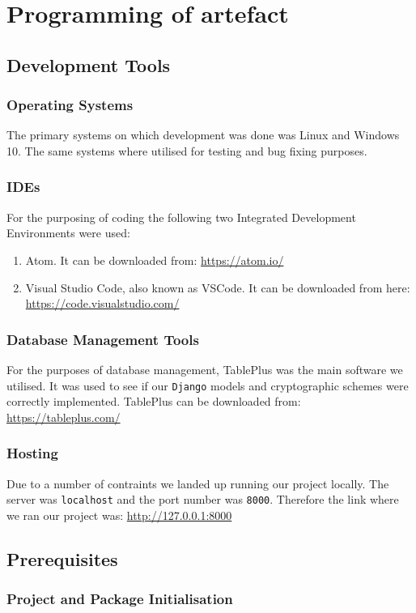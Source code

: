 \documentclass[a4paper, 12pt, titlepage]{report}
\begin{document}
\chapter{Programming of artefact}
\section{Development Tools}
\subsection{Operating Systems}
The primary systems on which development was done was Linux and Windows 10. The same systems where utilised for testing and bug fixing purposes.
\subsection{IDEs}
For the purposing of coding the following two Integrated Development Environments were used:
\begin{enumerate}
\item Atom. It can be downloaded from: \url{https://atom.io/}
\item Visual Studio Code, also known as VSCode. It can be downloaded from here: \url{https://code.visualstudio.com/}
\end{enumerate}
\subsection{Database Management Tools}
For the purposes of database management, TablePlus was the main software we utilised. It was used to see if our \texttt{Django} models and cryptographic schemes were correctly implemented. TablePlus can be downloaded from: \url{https://tableplus.com/}
\subsection{Hosting}
Due to a number of contraints we landed up running our project locally. The server was \texttt{localhost} and the port number was \texttt{8000}. Therefore the link where we ran our project was:
\url{http://127.0.0.1:8000}
\section{Prerequisites}
\subsection{Project and Package Initialisation}
\end{document}
